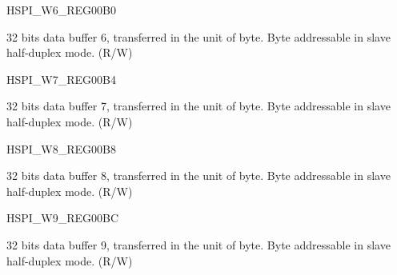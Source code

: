 \begin{register}{H}{SPI\_W6\_REG}{\hexprefix{}00B0}\label{regdesc:SPIW6REG}
%
\regnewline%
\begin{regdesc}\begin{reglist}
\label{fielddesc:SPIBUF6}\item [SPI\_BUF6] 32 bits data buffer 6, transferred in the unit of byte. Byte addressable in slave half-duplex mode. (R/W)
\end{reglist}\end{regdesc}
\end{register}


\begin{register}{H}{SPI\_W7\_REG}{\hexprefix{}00B4}\label{regdesc:SPIW7REG}
%
\regnewline%
\begin{regdesc}\begin{reglist}
\label{fielddesc:SPIBUF7}\item [SPI\_BUF7] 32 bits data buffer 7, transferred in the unit of byte. Byte addressable in slave half-duplex mode. (R/W)
\end{reglist}\end{regdesc}
\end{register}


\begin{register}{H}{SPI\_W8\_REG}{\hexprefix{}00B8}\label{regdesc:SPIW8REG}
%
\regnewline%
\begin{regdesc}\begin{reglist}
\label{fielddesc:SPIBUF8}\item [SPI\_BUF8] 32 bits data buffer 8, transferred in the unit of byte. Byte addressable in slave half-duplex mode. (R/W)
\end{reglist}\end{regdesc}
\end{register}


\begin{register}{H}{SPI\_W9\_REG}{\hexprefix{}00BC}\label{regdesc:SPIW9REG}
%
\regnewline%
\begin{regdesc}\begin{reglist}
\label{fielddesc:SPIBUF9}\item [SPI\_BUF9] 32 bits data buffer 9, transferred in the unit of byte. Byte addressable in slave half-duplex mode. (R/W)
\end{reglist}\end{regdesc}
\end{register}



